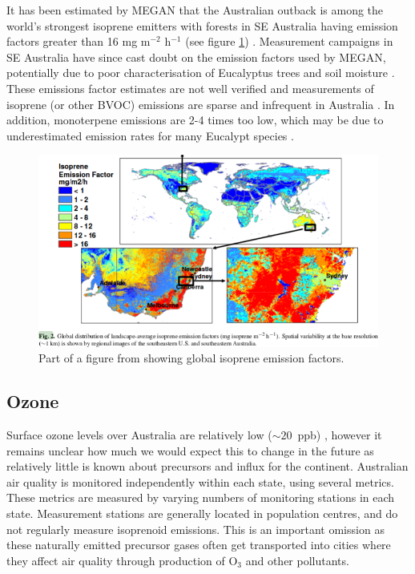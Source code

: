   
  It has been estimated by MEGAN that the Australian outback is among the world's strongest isoprene emitters with forests in SE Australia having emission factors greater than 16 mg m$^{-2}$ h$^{-1}$ (see figure \ref{LR:Aus:fig_MEGAN_EF}) \parencite{Guenther2006,Guenther2012}.
  Measurement campaigns in SE Australia have since cast doubt on the emission factors used by MEGAN, potentially due to poor characterisation of Eucalyptus trees and soil moisture \parencite{Emmerson2016}.
  These emissions factor estimates are not well verified and measurements of isoprene (or other BVOC) emissions are sparse and infrequent in Australia \parencite{Sindelarova2014, Bauwens2016}.
  In addition, monoterpene emissions are 2-4 times too low, which may be due to underestimated emission rates for many Eucalypt species \parencite{Winters2009,Emmerson2016}.

  \begin{figure}
    \includegraphics[width=\textwidth]{Figures/MeganIsoprene1.png}
    \caption{ Part of a figure from \textcite{Guenther2006} showing global isoprene emission factors. }
    \label{LR:Aus:fig_MEGAN_EF}
  \end{figure}
  
  
  \subsection{Ozone}
    Surface ozone levels over Australia are relatively low ($\sim20$~ppb) \parencite{Young2018}, however it remains unclear how much we would expect this to change in the future as relatively little is known about precursors and influx for the continent.
    Australian air quality is monitored independently within each state, using several metrics.
    These metrics are measured by varying numbers of monitoring stations in each state.
    Measurement stations are generally located in population centres, and do not regularly measure isoprenoid emissions. 
    This is an important omission as these naturally emitted precursor gases often get transported into cities where they affect air quality through production of O$_3$ and other pollutants.
    
